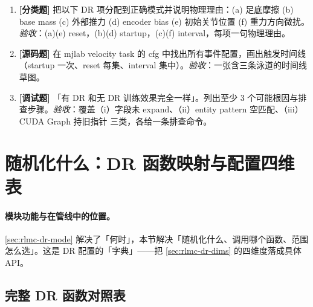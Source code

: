 \begin{practice}[本节练习]
\begin{enumerate}
  \item \textbf{[分类题]} 把以下 DR 项分配到正确模式并说明物理理由：(a) 足底摩擦 (b) base mass (c) 外部推力 (d) encoder bias (e) 初始关节位置 (f) 重力方向微扰。\emph{验收}：(a)(e) reset，(b)(d) startup，(c)(f) interval，每项一句物理理由。
  \item \textbf{[源码题]} 在 mjlab velocity task 的 cfg 中找出所有事件配置，画出触发时间线（startup 一次、reset 每集、interval 集中）。\emph{验收}：一张含三条泳道的时间线草图。
  \item \textbf{[调试题]} 「有 DR 和无 DR 训练效果完全一样」。列出至少 3 个可能根因与排查步骤。\emph{验收}：覆盖（i）字段未 expand、（ii）entity pattern 空匹配、（iii）CUDA Graph 持旧指针 三类，各给一条排查命令。
\end{enumerate}
\end{practice}

\section{随机化什么：DR 函数映射与配置四维表}
\label{sec:rlmc-dr-func}

\paragraph{模块功能与在管线中的位置。}\cref{sec:rlmc-dr-mode} 解决了「何时」，本节解决「随机化什么、调用哪个函数、范围怎么选」。这是 DR 配置的「字典」——把 \cref{sec:rlmc-dr-dims} 的四维度落成具体 API。

\subsection{完整 DR 函数对照表}
\label{sec:rlmc-dr-func-table}

